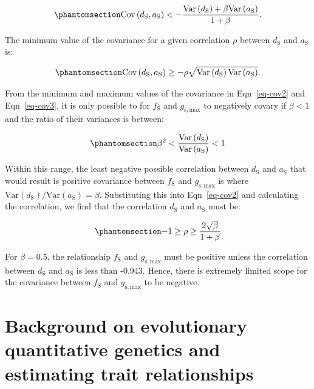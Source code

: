 \documentclass[
  letterpaper,
  DIV=11,
  numbers=noendperiod]{scrartcl}
\begin{document}
\begin{equation}\phantomsection\label{eq-cov2}{\text{Cov} \left(d_\text{S}, a_\text{S} \right) < -\frac{\text{Var} \left( d_\text{S} \right) + \beta \text{Var} \left( a_\text{S} \right)}{1 + \beta}.}\end{equation}

The minimum value of the covariance for a given correlation \(\rho\)
between \(d_\text{S}\) and \(a_\text{S}\) is:

\begin{equation}\phantomsection\label{eq-cov3}{\text{Cov} \left(d_\text{S}, a_\text{S} \right) \ge - \rho \sqrt{\text{Var} \left( d_\text{S} \right) \text{Var} \left( a_\text{S} \right)}.}\end{equation}

From the minimum and maximum values of the covariance in
Eqn~\ref{eq-cov2} and Eqn~\ref{eq-cov3}, it is only possible to for
\(f_\text{S}\) and \(g_\mathrm{s,max}\) to negatively covary if
\(\beta < 1\) and the ratio of their variances is between:

\begin{equation}\phantomsection\label{eq-ratio1}{ \beta ^ 2 < \frac{\text{Var} \left( d_\text{S} \right)}{\text{Var} \left( a_\text{S} \right)} < 1}\end{equation}

Within this range, the least negative possible correlation between
\(d_\text{S}\) and \(a_\text{S}\) that would result is positive
covariance between \(f_\text{S}\) and \(g_\mathrm{s,max}\) is where
\(\text{Var} \left( d_\text{S} \right) / \text{Var} \left( a_\text{S} \right) = \beta\).
Substituting this into Eqn~\ref{eq-cov2} and calculating the
correlation, we find that the correlation \(d_\text{S}\) and
\(a_\text{S}\) must be:

\begin{equation}\phantomsection\label{eq-rho}{ -1 \ge \rho \ge \frac{2 \sqrt{\beta}}{1 + \beta}}\end{equation}

For \(\beta = 0.5\), the relationship \(f_\text{S}\) and
\(g_\mathrm{s,max}\) must be positive unless the correlation between
\(d_\text{S}\) and \(a_\text{S}\) is less than -0.943. Hence, there is
extremely limited scope for the covariance between \(f_\text{S}\) and
\(g_\mathrm{s,max}\) to be negative.

\newpage

\section{Background on evolutionary quantitative genetics and estimating
trait relationships}\label{sec-background}
\end{document}
